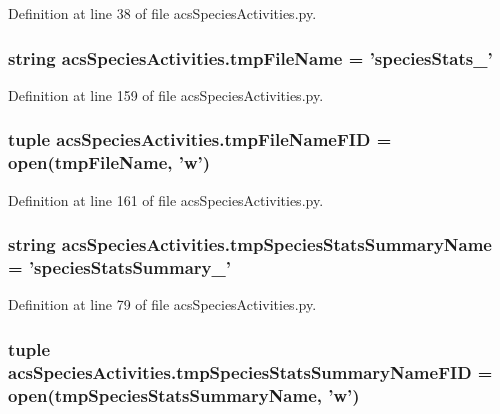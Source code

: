 Definition at line 38 of file acs\-Species\-Activities.\-py.

\hypertarget{a00103_a23844a8104156ee329f8c957f11490f4}{
\subsubsection[{tmp\-File\-Name}]{\setlength{\rightskip}{0pt plus 5cm}string acs\-Species\-Activities.\-tmp\-File\-Name = 'species\-Stats\-\_\-'}}\label{a00103_a23844a8104156ee329f8c957f11490f4}


Definition at line 159 of file acs\-Species\-Activities.\-py.

\hypertarget{a00103_addb867cf8533f2e18682c49f08f47bba}{
\subsubsection[{tmp\-File\-Name\-F\-I\-D}]{\setlength{\rightskip}{0pt plus 5cm}tuple acs\-Species\-Activities.\-tmp\-File\-Name\-F\-I\-D = open({\bf tmp\-File\-Name}, 'w')}}\label{a00103_addb867cf8533f2e18682c49f08f47bba}


Definition at line 161 of file acs\-Species\-Activities.\-py.

\hypertarget{a00103_aceab16acbf85893dcacfcfd921c9da12}{
\subsubsection[{tmp\-Species\-Stats\-Summary\-Name}]{\setlength{\rightskip}{0pt plus 5cm}string acs\-Species\-Activities.\-tmp\-Species\-Stats\-Summary\-Name = 'species\-Stats\-Summary\-\_\-'}}\label{a00103_aceab16acbf85893dcacfcfd921c9da12}


Definition at line 79 of file acs\-Species\-Activities.\-py.

\hypertarget{a00103_a57b362cf15dda461a59c719a92177c3a}{
\subsubsection[{tmp\-Species\-Stats\-Summary\-Name\-F\-I\-D}]{\setlength{\rightskip}{0pt plus 5cm}tuple acs\-Species\-Activities.\-tmp\-Species\-Stats\-Summary\-Name\-F\-I\-D = open({\bf tmp\-Species\-Stats\-Summary\-Name}, 'w')}}\label{a00103_a57b362cf15dda461a59c719a92177c3a}



